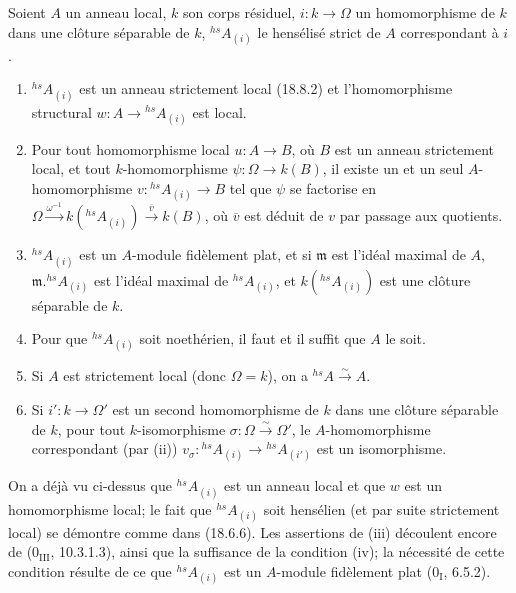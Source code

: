 \begin{proposition}[18.8.8]
\label{IV.18.8.8}
Soient $A$ un anneau local, $k$ son corps résiduel, $i:k\to\Omega$ un homomorphisme de $k$ dans une clôture séparable de $k$, ${}^{hs}\!A_{(i)}$ le hensélisé strict de $A$ correspondant à $i$.
\begin{enumerate}
  \item[(i)] ${}^{hs}\!A_{(i)}$ est un anneau strictement local (18.8.2) et l'homomorphisme structural $w:A\to{}^{hs}\!A_{(i)}$ est local.
  \item[(ii)] Pour tout homomorphisme local $u:A\to B$, où $B$ est un anneau strictement local, et tout $k$-homomorphisme $\psi:\Omega\to k(B)$, il existe un et un seul $A$-homomorphisme $v:{}^{hs}\!A_{(i)}\to B$ tel que $\psi$ se factorise en $\Omega\xrightarrow{\omega^{-1}}k({}^{hs}\!A_{(i)})\xrightarrow{\overline v}k(B)$, où $\overline v$ est déduit de $v$ par passage aux quotients.


  \item[(iii)] ${}^{hs}\!A_{(i)}$ est un $A$-module fidèlement plat, et si $\mathfrak m$ est l'idéal maximal de $A$, $\mathfrak m.{}^{hs}\!A_{(i)}$ est l'idéal maximal de ${}^{hs}\!A_{(i)}$, et $k({}^{hs}\!A_{(i)})$ est une clôture séparable de $k$.
  \item[(iv)] Pour que ${}^{hs}\!A_{(i)}$ soit noethérien, il faut et il suffit que $A$ le soit.
  \item[(v)] Si $A$ est strictement local (donc $\Omega=k$), on a ${}^{hs}\!A\xrightarrow{\sim}A$.
  \item[(vi)] Si $i':k\to\Omega'$ est un second homomorphisme de $k$ dans une clôture séparable de $k$, pour tout $k$-isomorphisme $\sigma:\Omega\xrightarrow{\sim}\Omega'$, le $A$-homomorphisme correspondant (par (ii)) $v_\sigma:{}^{hs}\!A_{(i)}\to{}^{hs}\!A_{(i')}$ est un isomorphisme.
\end{enumerate}
\end{proposition}

On a déjà vu ci-dessus que ${}^{hs}\!A_{(i)}$ est un anneau local et que $w$ est un homomorphisme local; le fait que ${}^{hs}\!A_{(i)}$ soit hensélien (et par suite strictement local) se démontre comme dans (18.6.6). Les assertions de (iii) découlent encore de ($0_{\mathrm{III}}$, 10.3.1.3), ainsi que la suffisance de la condition (iv); la nécessité de cette condition résulte de ce que ${}^{hs}\!A_{(i)}$ est un $A$-module fidèlement plat ($0_{\mathrm I}$, 6.5.2).

